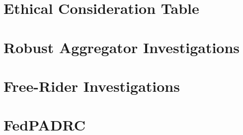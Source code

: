 \chapter{Ethical Consideration Table}


\chapter{Robust Aggregator Investigations}


\chapter{Free-Rider Investigations}


\chapter{FedPADRC}

